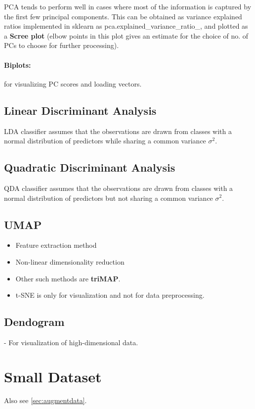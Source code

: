 \documentclass[a4paper, 12pt]{report}
\begin{document}
PCA tends to perform well in cases where most of the information is captured by the first few principal components. This can be obtained as variance explained ratios implemented in sklearn as pca.explained\_variance\_ratio\_, and plotted as a \textbf{Scree plot} (elbow points in this plot gives an estimate for the choice of no. of PCs to choose for further processing).

\paragraph{Biplots:}for visualizing PC scores and loading vectors.


\subsection{Linear Discriminant Analysis}
LDA classifier assumes that the observations are drawn from classes with a normal distribution of predictors while sharing a common variance $\sigma^2$.


\subsection{Quadratic Discriminant Analysis}
QDA classifier assumes that the observations are drawn from classes with a normal distribution of predictors but not sharing a common variance $\sigma^2$.


\subsection{UMAP}
\begin{itemize}
\item Feature extraction method
\item Non-linear dimensionality reduction
\item Other such methods are \textbf{triMAP}.
\item t-SNE is only for visualization and not for data preprocessing.
\end{itemize}


\subsection{Dendogram}
- For visualization of high-dimensional data.

\section{Small Dataset}
Also see  \autoref{sec:augmentdata}.
\end{document}
